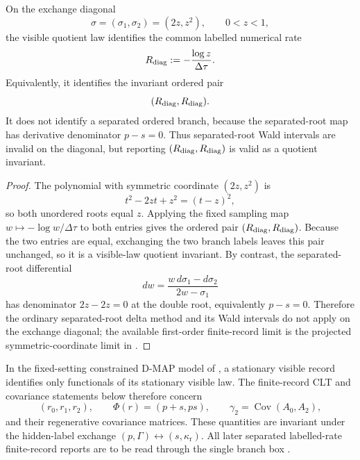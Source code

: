 

\begin{lemma}\label{lem:diagonal-common-rate-main}
On the exchange diagonal
\[
\sigma=(\sigma_1,\sigma_2)=(2z,z^2),\qquad 0<z<1,
\]
the visible quotient law identifies the common labelled numerical rate
\[
R_{\rm diag}:=-\frac{\log z}{\Delta\tau}.
\]
Equivalently, it identifies the invariant ordered pair
\[
(R_{\rm diag},R_{\rm diag}).
\]
It does not identify a separated ordered branch, because the
separated-root map has derivative denominator \(p-s=0\).  Thus separated-root
Wald intervals are invalid on the diagonal, but reporting
\((R_{\rm diag},R_{\rm diag})\) is valid as a quotient invariant.
\end{lemma}

\begin{proof}
The polynomial with symmetric coordinate \((2z,z^2)\) is
\[
t^2-2zt+z^2=(t-z)^2,
\]
so both unordered roots equal \(z\).  Applying the fixed sampling map
\(w\mapsto-\log w/\Delta\tau\) to both entries gives the ordered pair
\((R_{\rm diag},R_{\rm diag})\).  Because the two entries are equal,
exchanging the two branch labels leaves this pair unchanged, so it is a
visible-law quotient invariant.  By contrast, the separated-root
differential
\[
dw=\frac{w\,d\sigma_1-d\sigma_2}{2w-\sigma_1}
\]
has denominator \(2z-2z=0\) at the double root, equivalently \(p-s=0\).
Therefore the ordinary separated-root delta method and its Wald intervals do
not apply on the exchange diagonal; the available first-order finite-record
limit is the projected symmetric-coordinate limit in
.
\end{proof}

\begin{proposition}\label{thm:identifiable-finite-record-estimands-main}
In the fixed-setting constrained D-MAP model of
, a stationary visible record
identifies only functionals of its stationary visible law.  The finite-record
CLT and covariance statements below therefore concern
\[
(r_0,r_1,r_2),\qquad
\Phi(r)=(p+s,ps),\qquad
\gamma_2=\operatorname{Cov}(A_0,A_2),
\]
and their regenerative covariance matrices.  These quantities are invariant
under the hidden-label exchange
\((p,\Gamma)\leftrightarrow(s,\kappa_{\mathrm r})\).  All later separated
labelled-rate finite-record reports are to be read through the single branch
box .
\end{proposition}

